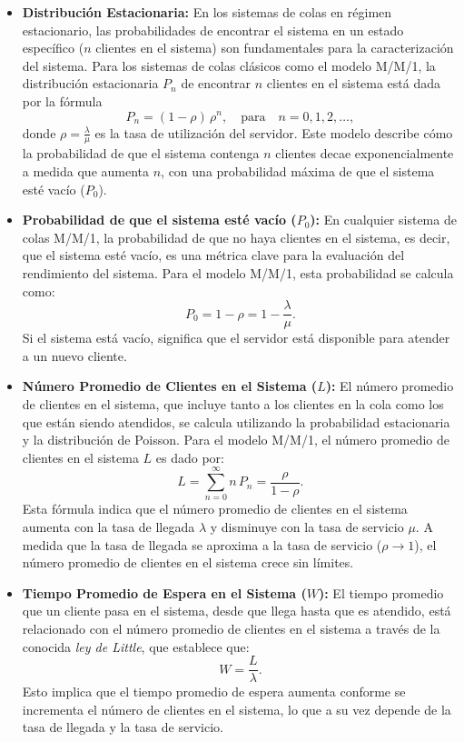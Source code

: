 \documentclass{article}
\begin{document}
\begin{itemize}
    \item \textbf{Distribución Estacionaria:}  
    En los sistemas de colas en régimen estacionario, las probabilidades de encontrar el sistema en un estado específico (\(n\) clientes en el sistema) son fundamentales para la caracterización del sistema. Para los sistemas de colas clásicos como el modelo M/M/1, la distribución estacionaria \(P_n\) de encontrar \(n\) clientes en el sistema está dada por la fórmula
    \[
      P_n = (1 - \rho)\,\rho^n, \quad \text{para} \quad n = 0, 1, 2, \dots,
    \]
    donde \( \rho = \frac{\lambda}{\mu} \) es la tasa de utilización del servidor. Este modelo describe cómo la probabilidad de que el sistema contenga \(n\) clientes decae exponencialmente a medida que aumenta \(n\), con una probabilidad máxima de que el sistema esté vacío (\(P_0\)).

    \item \textbf{Probabilidad de que el sistema esté vacío (\(P_0\)):}  
    En cualquier sistema de colas M/M/1, la probabilidad de que no haya clientes en el sistema, es decir, que el sistema esté vacío, es una métrica clave para la evaluación del rendimiento del sistema. Para el modelo M/M/1, esta probabilidad se calcula como:
    \[
      P_0 = 1 - \rho = 1 - \frac{\lambda}{\mu}.
    \]
    Si el sistema está vacío, significa que el servidor está disponible para atender a un nuevo cliente.

    \item \textbf{Número Promedio de Clientes en el Sistema (\(L\)):}  
    El número promedio de clientes en el sistema, que incluye tanto a los clientes en la cola como los que están siendo atendidos, se calcula utilizando la probabilidad estacionaria y la distribución de Poisson. Para el modelo M/M/1, el número promedio de clientes en el sistema \(L\) es dado por:
    \[
      L = \sum_{n=0}^{\infty} n\,P_n = \frac{\rho}{1 - \rho}.
    \]
    Esta fórmula indica que el número promedio de clientes en el sistema aumenta con la tasa de llegada \(\lambda\) y disminuye con la tasa de servicio \(\mu\). A medida que la tasa de llegada se aproxima a la tasa de servicio (\(\rho \to 1\)), el número promedio de clientes en el sistema crece sin límites.

    \item \textbf{Tiempo Promedio de Espera en el Sistema (\(W\)):}  
    El tiempo promedio que un cliente pasa en el sistema, desde que llega hasta que es atendido, está relacionado con el número promedio de clientes en el sistema a través de la conocida \textit{ley de Little}, que establece que:
    \[
      W = \frac{L}{\lambda}.
    \]
    Esto implica que el tiempo promedio de espera aumenta conforme se incrementa el número de clientes en el sistema, lo que a su vez depende de la tasa de llegada y la tasa de servicio.


\end{itemize}
\end{document}

